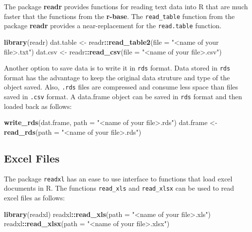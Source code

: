 \documentclass[]{book}
\newenvironment{Shaded}{\begin{snugshade}}{\end{snugshade}}
\newcommand{\KeywordTok}[1]{\textcolor[rgb]{0.13,0.29,0.53}{\textbf{#1}}}
\newcommand{\DataTypeTok}[1]{\textcolor[rgb]{0.13,0.29,0.53}{#1}}
\newcommand{\StringTok}[1]{\textcolor[rgb]{0.31,0.60,0.02}{#1}}
\newcommand{\OperatorTok}[1]{\textcolor[rgb]{0.81,0.36,0.00}{\textbf{#1}}}
\newcommand{\NormalTok}[1]{#1}
\begin{document}
The package \textbf{readr} provides functions for reading text data into
R that are much faster that the functions from the \textbf{r-base}. The
\texttt{read\_table} function from the package \textbf{readr} provides a
near-replacement for the \texttt{read.table} function.

\begin{Shaded}
\begin{Highlighting}[]
\KeywordTok{library}\NormalTok{(readr)}
\NormalTok{dat.table <-}\StringTok{ }\NormalTok{readr}\OperatorTok{::}\KeywordTok{read_table2}\NormalTok{(}\DataTypeTok{file =} \StringTok{"<name of your file>.txt"}\NormalTok{)}
\NormalTok{dat.csv <-}\StringTok{ }\NormalTok{readr}\OperatorTok{::}\KeywordTok{read_csv}\NormalTok{(}\DataTypeTok{file =} \StringTok{"<name of your file>.csv"}\NormalTok{)}
\end{Highlighting}
\end{Shaded}

Another option to save data is to write it in \texttt{rds} format. Data
stored in \texttt{rds} format has the advantage to keep the original
data struture and type of the object saved. Also, \texttt{.rds} files
are compressed and consume less space than files saved in \texttt{.csv}
format. A data.frame object can be saved in \texttt{rds} format and then
loaded back as follows:

\begin{Shaded}
\begin{Highlighting}[]
\KeywordTok{write_rds}\NormalTok{(dat.frame, }\DataTypeTok{path =} \StringTok{"<name of your file>.rds"}\NormalTok{)}
\NormalTok{dat.frame <-}\StringTok{ }\KeywordTok{read_rds}\NormalTok{(}\DataTypeTok{path =} \StringTok{"<name of your file>.rds"}\NormalTok{)}
\end{Highlighting}
\end{Shaded}

\subsection{Excel Files}\label{excel-files}

The package \texttt{readxl} has an ease to use interface to functions
that load excel documents in R. The functions \texttt{read\_xls} and
\texttt{read\_xlsx} can be used to read excel files as follows:

\begin{Shaded}
\begin{Highlighting}[]
\KeywordTok{library}\NormalTok{(readxl)}
\NormalTok{readxl}\OperatorTok{::}\KeywordTok{read_xls}\NormalTok{(}\DataTypeTok{path =} \StringTok{"<name of your file>.xls"}\NormalTok{)}
\NormalTok{readxl}\OperatorTok{::}\KeywordTok{read_xlsx}\NormalTok{(}\DataTypeTok{path =} \StringTok{"<name of your file>.xlsx"}\NormalTok{)}
\end{Highlighting}
\end{Shaded}
\end{document}
